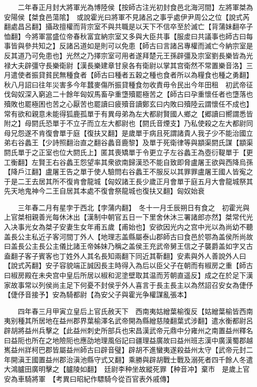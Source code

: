 　　二年春正月封大將軍光為博陸侯【按師古注光初封食邑北海河間】左將軍桀為安陽侯【桀食邑蕩隂】　或說霍光曰將軍不見諸呂之事乎處伊尹周公之位【說式芮翻處昌呂翻】攝政擅權而背宗室不與共職是以天下不信卒至於滅亡【背蒲妹翻卒子恤翻】今將軍當盛位帝春秋富宜納宗室又多與大臣共事【服䖍曰共議事也師古曰每事皆與參共知之】反諸呂道如是則可以免患【師古曰言諸呂專權而滅亡今納宗室是反其道乃可免患也】光然之乃擇宗室可用者遂拜楚元王孫辟彊及宗室劉長樂皆為光禄大夫辟彊守長樂衛尉【漢長樂建章甘泉各有衛尉以掌其宫衛然不常置樂音洛】三月遣使者振貸貧民無種食者【師古曰種者五穀之種也食者所以為糧食也種之勇翻】　秋八月詔曰往年災害多今年蠺麥傷所振貸種食勿收責毋令民出今年田租　初武帝征伐匈奴深入窮追二十餘年匈奴馬畜孕重墯殰罷極苦之【師古曰孕重懷任者也墯落也殰敗也罷極困也苦之心厭苦也罷讀曰疲殰音讀鄭玄曰内敗曰殰陸云謂懷任不成也】常有欲和親意未能得狐鹿孤單于有異母弟為左大都尉賢國人鄉之【郷讀曰嚮謂悉皆附之】母閼氏恐單于不立子而立左大都尉也【閼氏音煙支】乃私使殺之左大都尉同母兄怨遂不肯復會單于庭【復扶又翻】是歲單于病且死謂諸貴人我子少不能治國立弟右谷蠡王【少詩照翻治直之翻谷蠡音鹿黎】及單于死衛律等與顓渠閼氏謀【顓渠閼氏單于之正室也位大閼氏上】匿其喪矯單于令更立子左谷蠡王為壺衍鞮單于【更工衡翻】左賢王右谷蠡王怨望率其衆欲南歸漢恐不能自致即脅盧屠王欲與西降烏孫【降戶江翻】盧屠王告之單于使人驗問右谷蠡王不服反以其罪罪盧屠王國人皆寃之于是二王去居其所不復肯會龍城【匈奴諸王長少歲正月會單于庭五月大會龍城祭其先天地鬼神今二王自居其本處不復會祭龍城也復扶又翻】匈奴始衰

　　三年春二月有星孛于西北【孛蒲内翻】　冬十一月壬辰朔日有食之　初霍光與上官桀相親善光每休沐出【漢制中朝官五日一下里舍休沐三署諸郎亦然】桀常代光入决事光女為桀子安妻生女年甫五歲【甫始也】安欲因光内之宫中光以為尚幼不聽盖長公主私近子客河間丁外人【地理志盖縣屬泰山郡師古曰食邑於鄂為盖侯所尚故曰盖長公主長公主儀比諸王帝姊妹乃稱之盖侯王充武帝舅王信之子襲爵盖如字又古盍翻子客子賓客也丁姓外人其名長知兩翻下同近其靳翻】安素與外人善說外人曰【說式芮翻】安子容貌端正誠因長主時得入為后以臣父子在朝而有椒房之重【師古曰椒房殿在未央宫中皇后所居以椒和泥塗壁取其温而芳朝直遥反】成之在於足下漢家故事常以列侯尚主足下何憂不封侯乎外人喜言于長主長主以為然詔召安女為倢伃【倢伃音接予】安為騎都尉【為安父子與霍光争權謀亂張本】

　　四年春三月甲寅立皇后上官氏赦天下　西南夷姑繒葉榆復反【姑繒葉榆皆西南夷别種其所居地在益州郡界葉榆澤名武帝開為縣繒慈陵翻葉式涉翻】遣水衡都尉呂辟胡將益州兵擊之【此益州刺史所部兵也宋昌漢武帝元鼎中分雍州之南置益州釋名曰益阨也所在之地險阨也應劭地理風俗記曰疆理益廣故曰益州班志漢中廣漢蜀郡越嶲益州牂柯巴郡皆屬益州師古曰辟音璧】辟胡不進蠻夷遂殺益州太守【武帝元封二年開滇王國置益州郡治滇池縣守式又翻】乘勝與辟胡戰士戰及溺死者四千餘人冬遣大鴻臚田廣明擊之【臚陵如翻】　廷尉李种坐故縱死罪【种音冲】棄市　是歲上官安為車騎將軍　【考異曰昭紀作驃騎今從百官表外戚傳】

